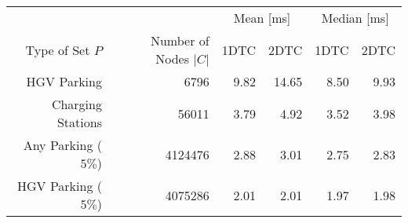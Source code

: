 \begin{tabular}{rrrrrr}
	\toprule
	                    &                       & \multicolumn{2}{c}{Mean [\si{\milli\second}]} & \multicolumn{2}{c}{Median [\si{\milli\second}]}               \\
	Type of Set $P$     & Number of Nodes $|C|$ & 1DTC                                          & 2DTC                                            & 1DTC & 2DTC \\
	\midrule
	HGV Parking         & 6796                     & 9.82                                             & 14.65                                               & 8.50    & 9.93    \\
	Charging Stations   & 56011                     & 3.79                                             & 4.92                                               & 3.52    & 3.98    \\
	Any Parking ($5\%$) & 4124476                     & 2.88                                             & 3.01                                               & 2.75    & 2.83    \\
	HGV Parking ($5\%$) & 4075286                     & 2.01                                             & 2.01                                               & 1.97    & 1.98    \\
	\bottomrule
\end{tabular}